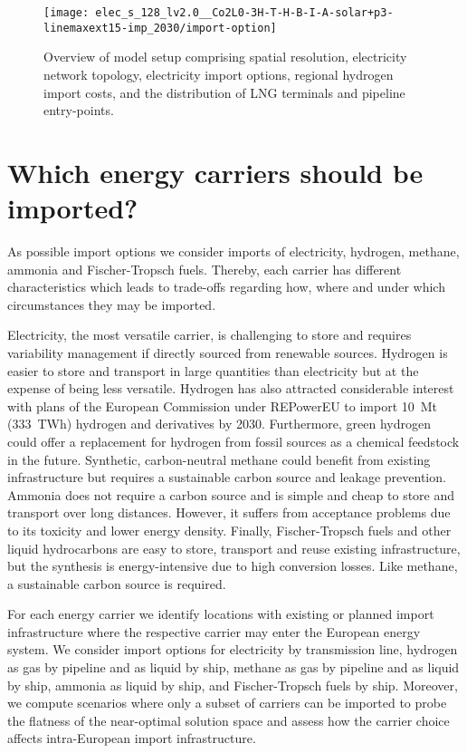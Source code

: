 \documentclass[10pt,5p,reversenotenum,lefttitle]{elsarticle}
\begin{document}
\begin{figure*}[ht]
    \centering
    \texttt{[image: elec\_s\_128\_lv2.0\_\_Co2L0-3H-T-H-B-I-A-solar+p3-linemaxext15-imp\_2030/import-option]}
    \caption{Overview of model setup comprising spatial resolution, electricity network topology, electricity import options, regional hydrogen import costs, and the distribution of LNG terminals and pipeline entry-points.}
    \label{fig:import-option}
\end{figure*}

\section*{Which energy carriers should be imported?}

As possible import options we consider imports of electricity, hydrogen,
methane, ammonia and Fischer-Tropsch fuels. Thereby, each carrier has different
characteristics which leads to trade-offs regarding how, where and under which
circumstances they may be imported.

Electricity, the most versatile carrier, is challenging to store and requires
variability management if directly sourced from renewable sources. Hydrogen is
easier to store and transport in large quantities than electricity but at the
expense of being less versatile. Hydrogen has also attracted considerable
interest with plans of the European Commission under
\mbox{REPowerEU}\cite{europeancommissionRepowerEUPlan} to import 10~Mt (333~TWh)
hydrogen and derivatives by 2030. Furthermore, green hydrogen could offer a
replacement for hydrogen from fossil sources as a chemical feedstock in the
future. Synthetic, carbon-neutral methane could benefit from existing
infrastructure but requires a sustainable carbon source and leakage prevention.
Ammonia does not require a carbon source and is simple and cheap to store and
transport over long distances. However, it suffers from acceptance problems due
to its toxicity and lower energy density. Finally, Fischer-Tropsch fuels and
other liquid hydrocarbons are easy to store, transport and reuse existing
infrastructure, but the synthesis is energy-intensive due to high conversion
losses. Like methane, a sustainable carbon source is required.

For each energy carrier we identify locations with existing or planned import
infrastructure where the respective carrier may enter the European energy
system. We consider import options for electricity by transmission line,
hydrogen as gas by pipeline and as liquid by ship, methane as gas by
pipeline and as liquid by ship, ammonia as liquid by ship, and Fischer-Tropsch
fuels by ship. Moreover, we compute scenarios where only a subset of carriers
can be imported to probe the flatness of the near-optimal solution space and
assess how the carrier choice affects intra-European import infrastructure.
\end{document}
